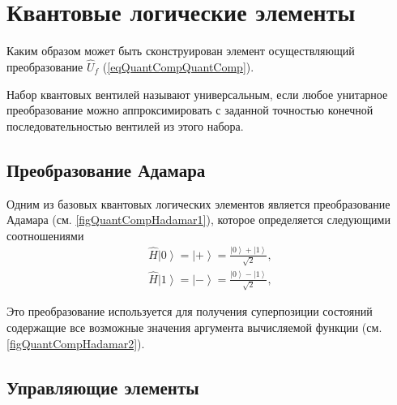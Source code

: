 \section{Квантовые логические элементы}
Каким образом может быть сконструирован элемент осуществляющий
преобразование $\hat{U}_f$ (\ref{eqQuantCompQuantComp}).

Набор квантовых вентилей называют универсальным, если любое унитарное
преобразование можно аппроксимировать с заданной точностью конечной
последовательностью вентилей из этого набора.

\subsection{Преобразование Адамара}

Одним из базовых квантовых логических элементов является
преобразование Адамара (см. \autoref{figQuantCompHadamar1}), которое
определяется следующими соотношениями
\begin{eqnarray}
\hat{H} \left|0\right> = \left|+\right> =  
\frac{\left|0\right> + \left|1\right> }{\sqrt{2}},
\nonumber \\
\hat{H} \left|1\right> = \left|-\right> = 
\frac{\left|0\right> - \left|1\right> }{\sqrt{2}},
\nonumber
\end{eqnarray}



Это преобразование используется для получения суперпозиции состояний
содержащие все возможные значения аргумента вычисляемой функции
(см. \autoref{figQuantCompHadamar2}). 



\subsection{Управляющие элементы}






 


